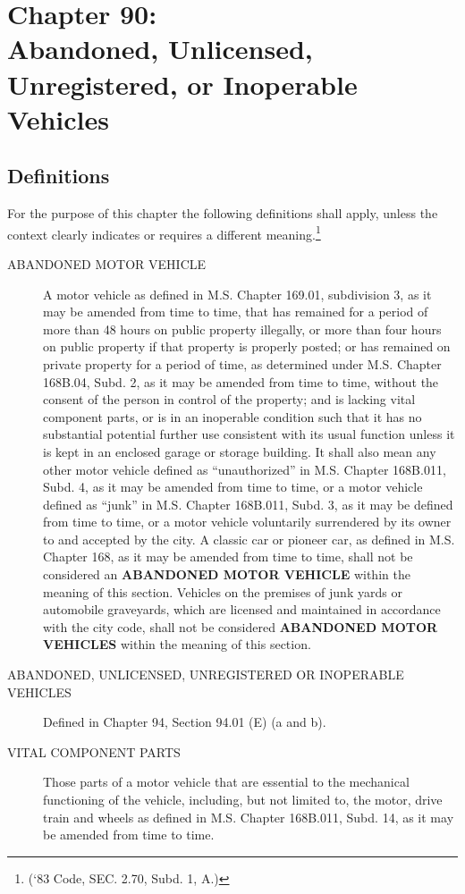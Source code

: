 \chapter*{Chapter 90: \\
	Abandoned, Unlicensed, Unregistered, or Inoperable Vehicles}
    \vfill
    \minitoc
    \pagebreak

\section{Definitions}
For the purpose of this chapter the following definitions shall apply, unless the context clearly indicates or requires a different meaning.\footnote{(‘83 Code, SEC. 2.70, Subd. 1, A.)}
\begin{description}
\item[ABANDONED MOTOR VEHICLE] A motor vehicle as defined in M.S. Chapter 169.01, subdivision 3, as it may be amended from time to time, that has remained for a period of more than 48 hours on public property illegally, or more than four hours on public property if that property is properly posted; or has remained on private property for a period of time, as determined under M.S. Chapter 168B.04, Subd. 2, as it may be amended from time to time, without the consent of the person in control of the property; and is lacking vital component parts, or is in an inoperable condition such that it has no substantial potential further use consistent with its usual function unless it is kept in an enclosed garage or storage building.  It shall also mean any other motor vehicle defined as “unauthorized” in M.S. Chapter 168B.011, Subd. 4, as it may be amended from time to time, or a motor vehicle defined as “junk” in M.S. Chapter 168B.011, Subd. 3, as it may be defined from time to time, or a motor vehicle voluntarily surrendered by its owner to and accepted by the city.  A classic car or pioneer car, as defined in M.S. Chapter 168, as it may be amended from time to time, shall not be considered an \textbf{ABANDONED MOTOR VEHICLE} within the meaning of this section.  Vehicles on the premises of junk yards or automobile graveyards, which are licensed and maintained in accordance with the city code, shall not be considered \textbf{ABANDONED MOTOR VEHICLES} within the meaning of this section.
\item[ABANDONED, UNLICENSED, UNREGISTERED OR INOPERABLE VEHICLES] Defined in Chapter 94, Section 94.01 (E) (a and b).
\item[VITAL COMPONENT PARTS] Those parts of a motor vehicle that are essential to the mechanical functioning of the vehicle, including, but not limited to, the motor, drive train and wheels as defined in M.S. Chapter 168B.011, Subd. 14, as it may be amended from time to time.
\end{description}

